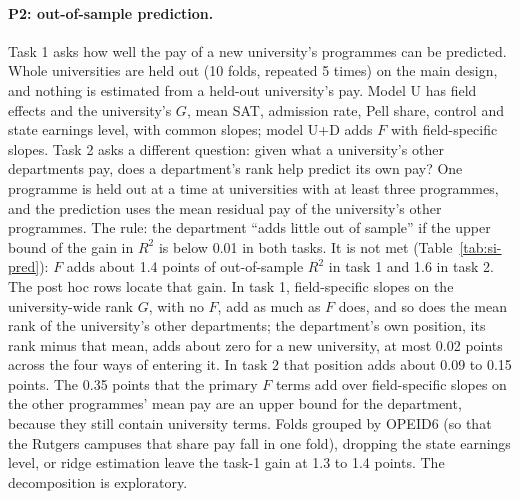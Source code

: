 \documentclass[11pt]{article}
\begin{document}
\paragraph{P2: out-of-sample prediction.} Task 1 asks how well the pay of a new university's programmes can be
predicted. Whole universities are held out (10 folds, repeated 5 times) on the main design, and nothing is estimated
from a held-out university's pay. Model U has field effects and the university's $G$, mean SAT, admission rate, Pell
share, control and state earnings level, with common slopes; model U+D adds $F$ with field-specific slopes. Task 2 asks
a different question: given what a university's other departments pay, does a department's rank help predict its own
pay? One programme is held out at a time at universities with at least three programmes, and the prediction uses the
mean residual pay of the university's other programmes. The rule: the department ``adds little out of sample'' if the
upper bound of the gain in $R^2$ is below 0.01 in both tasks. It is not met (Table~\ref{tab:si-pred}): $F$ adds about
1.4 points of out-of-sample $R^2$ in task 1 and 1.6 in task 2. The post hoc rows locate that gain. In task 1,
field-specific slopes on the university-wide rank $G$, with no $F$, add as much as $F$ does, and so does the mean rank
of the university's other departments; the department's own position, its rank minus that mean, adds about zero for a
new university, at most 0.02 points across the four ways of entering it. In task 2 that position adds about 0.09 to
0.15 points. The 0.35 points that the primary $F$ terms add over field-specific slopes on the other programmes' mean
pay are an upper bound for the department, because they still contain university terms. Folds grouped by OPEID6 (so
that the Rutgers campuses that share pay fall in one fold), dropping the state earnings level, or ridge estimation
leave the task-1 gain at 1.3 to 1.4 points. The decomposition is exploratory.
\end{document}
